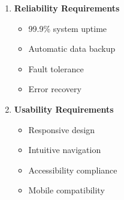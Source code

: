 \begin{enumerate}
    \item \textbf{Reliability Requirements}
    \begin{itemize}
        \item 99.9\% system uptime
        \item Automatic data backup
        \item Fault tolerance
        \item Error recovery
    \end{itemize}

    \item \textbf{Usability Requirements}
    \begin{itemize}
        \item Responsive design
        \item Intuitive navigation
        \item Accessibility compliance
        \item Mobile compatibility
    \end{itemize}
\end{enumerate} 